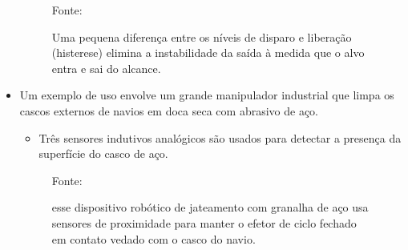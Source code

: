 \documentclass[xcolor=dvipsnames, aspectratio=169]{beamer}
\begin{document}
\begin{frame}
\begin{itemize}
\begin{figure}
			{Fonte: \cite{everett1995sensors}}
			\caption{Uma pequena diferença entre os níveis de disparo e liberação (histerese) elimina a instabilidade da saída à medida que o alvo entra e sai do alcance.}
			\label{fig:4_inductive_sensor}
		\end{figure}
		\item Um exemplo de uso envolve um grande manipulador industrial que limpa os cascos externos de navios em doca seca com abrasivo de aço. 
		\begin{itemize}
			\item Três sensores indutivos analógicos são usados para detectar a presença da superfície do casco de aço.
		\end{itemize}
		\begin{figure}
			\centering
			{Fonte: \cite{everett1995sensors}}
			\caption{esse dispositivo robótico de jateamento com granalha de aço usa sensores de proximidade para manter o efetor de ciclo fechado em contato vedado com o casco do navio.}
			\label{fig:5_robotic_shot_blasting_device_ship}
		\end{figure}
	\end{itemize}
\end{frame}

\end{document}
